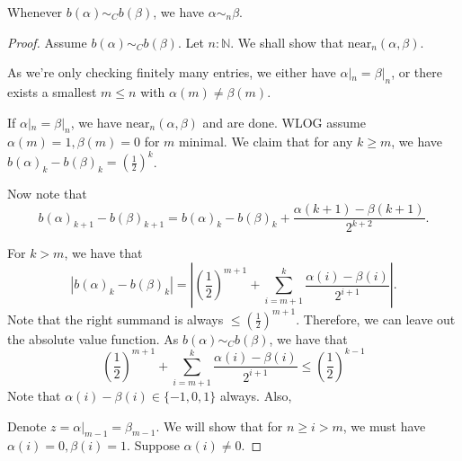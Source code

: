 \begin{lemma}
  Whenever $b(\alpha) \sim_C b(\beta)$, 
  we have $\alpha \sim_n \beta$. 
\end{lemma}
\begin{proof}
  Assume $b(\alpha) \sim_Cb (\beta)$. 
  Let $n:\mathbb N$. 
  We shall show that $\text{near}_n(\alpha , \beta)$. 

  As we're only checking finitely many entries, 
  we either have $\alpha|_n = \beta|_n$, 
  or there exists a smallest $m\leq n$ with 
  $\alpha(m) \neq \beta(m)$. 

  If $\alpha|_n = \beta|_n$, we have $\text{near}_n(\alpha,\beta)$ and are done. 
  WLOG assume $\alpha(m) = 1, \beta(m) = 0$ for $m$ minimal. 
  We claim that for any $k\geq m$, we have 
  $b(\alpha)_k - b(\beta)_k = (\frac12)^k$. 

  Now note that 
  \begin{equation} 
    b(\alpha)_{k+1} - b(\beta)_{k+1} = 
    b(\alpha)_{k} - b(\beta)_{k} + 
    \frac{\alpha(k+1) - \beta(k+1)}{2^{k+2}}.
  \end{equation}




  For $k>m$, we have that 
  \begin{equation}
  |b(\alpha)_k - b(\beta)_k |= 
  |(\frac12)^{m+1} + \sum\limits_{i=m+1}^k \frac{ \alpha(i) -\beta(i)}{2^{i+1}}|. 
  \end{equation}
  Note that the right summand is always $\leq (\frac12)^{m+1}$. 
  Therefore, we can leave out the absolute value function. 
  As $b(\alpha) \sim_Cb(\beta)$, we have that 
  \begin{equation}
  (\frac12)^{m+1} + \sum\limits_{i=m+1}^k \frac{ \alpha(i) -\beta(i)}{2^{i+1}} \leq (\frac12)^{k-1}
  \end{equation}
  Note that $\alpha(i) -\beta(i) \in \{-1,0,1\}$ always. 
  Also, 

  Denote $z = \alpha|_{m-1} = \beta_{m-1}$. 
  We will show that for $n\geq i>m$, we must have $\alpha(i) = 0, \beta(i) = 1$. 
  Suppose $\alpha(i) \neq 0$. 
\end{proof}

%
%
%
%
